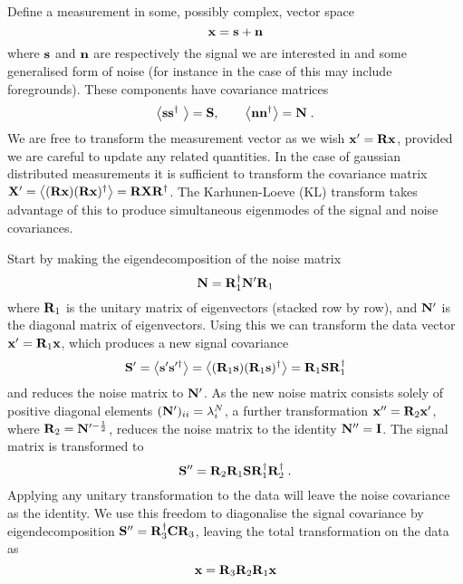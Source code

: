 \documentclass[onecolumn]{revtex4}
\begin{document}
Define a measurement in some, possibly complex, vector space
\begin{equation}
\mathbf{x} = \mathbf{s} + \mathbf{n}
\end{equation}
where $\mathbf{s}$ and $\mathbf{n}$ are respectively the signal we are interested in and some
generalised form of noise (for instance in the case of \tcm this may include
foregrounds). These components have covariance matrices
\begin{equation}
\left\langle \mathbf{s} \mathbf{s}^{\dagger}\ \right\rangle = \mathbf{S}, \qquad \left\langle \mathbf{n} \mathbf{n}^{\dagger} \right\rangle = \mathbf{N} \; .
\end{equation}
We are free to transform the measurement vector as we wish $\mathbf{x}' = \mathbf{R}\mathbf{x}$,
provided we are careful to update any related quantities. In the case of
gaussian distributed measurements it is sufficient to transform the covariance
matrix $\mathbf{X}' = \left\langle (\mathbf{R} \mathbf{x}) (\mathbf{R} \mathbf{x})^{\dagger} \right\rangle = \mathbf{R}
\mathbf{X}\mathbf{R}^{\dagger}$. The Karhunen-Loeve (KL) transform takes advantage of this to
produce simultaneous eigenmodes of the signal and noise covariances.

Start by making the eigendecomposition of the noise matrix
\begin{equation}
\mathbf{N} = \mathbf{R}_1^{\dagger} \mathbf{N}' \mathbf{R}_1
\end{equation}
where $\mathbf{R}_1$ is the unitary matrix of eigenvectors (stacked row by row), and
$\mathbf{N}'$ is the diagonal matrix of eigenvectors. Using this we can transform the
data vector $\mathbf{x}' = \mathbf{R}_1 \mathbf{x}$, which produces a new signal covariance
\begin{equation}
\mathbf{S}' = \left\langle \mathbf{s}' \mathbf{s}'^{\dagger} \right\rangle = \left\langle (\mathbf{R}_1 \mathbf{s})  (\mathbf{R}_1 \mathbf{s})^{\dagger}
\right\rangle = \mathbf{R}_1 \mathbf{S} \mathbf{R}_1^{\dagger}
\end{equation}
and reduces the noise matrix to $\mathbf{N}'$. As the new noise matrix consists solely
of positive diagonal elements $(\mathbf{N}')_{ii} = \lambda^N_i$, a further
transformation $\mathbf{x}'' = \mathbf{R}_2 \mathbf{x}'$, where $\mathbf{R}_2 = \mathbf{N}'^{-\frac{1}{2}}$,
reduces the noise matrix to the identity $\mathbf{N}'' = \mathbf{I}$. The signal matrix is
transformed to
\begin{equation}
\mathbf{S}'' = \mathbf{R}_2 \mathbf{R}_1 \mathbf{S} \mathbf{R}_1^{\dagger} \mathbf{R}_2^{\dagger} \; .
\end{equation}
Applying any unitary transformation to the data will leave the noise covariance
as the identity. We use this freedom to diagonalise the signal covariance by
eigendecomposition $\mathbf{S}'' = \mathbf{R}_3^{\dagger} \mathbf{C} \mathbf{R}_3$, leaving the total
transformation on the data as
\begin{equation}
\mathbf{x} = \mathbf{R}_3 \mathbf{R}_2 \mathbf{R}_1 \mathbf{x}
\end{equation}
\end{document}
